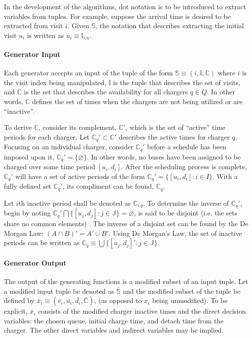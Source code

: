 \documentclass[11pt,a4paper,final]{article}
\newcommand{\I}{\mathbb{I}}                 %
\newcommand{\C}{\mathbb{C}}                 %
\newcommand{\Sol}{\mathbb{S}}               %
\newcommand{\Qset}{Q}                       %
\newcommand{\Jsetq}{\mathbb{J}}             %
\begin{document}
In the development of the algorithms, dot notation is to be introduced to extract variables from tuples. For example,
suppose the arrival time is desired to be extracted from visit \(i\). Given \(\Sol\), the notation that describes extracting
the initial visit \(u_i\) is written as \(u_i \equiv \I_{i.u}\).

\paragraph{Generator Input}
\label{sec:org8a387a7}
Each generator accepts an input of the tuple of the form \(\Sol \equiv (i, \I, \C)\) where \(i\) is the visit index being
manipulated, \(\I\) is the tuple that describes the set of visits, and \(\C\) is the set that describes the availability for
all chargers \(q \in \Qset\). In other words, \(\C\) defines the set of times when the chargers are not being utilized or are
``inactive''.

To derive \(\C\), consider its complement, \(\C'\), which is the set of ``active'' time periods for each charger. Let \(\C_q' \subset
\C'\) describes the active times for charger \(q\). Focusing on an individual charger, consider \(\C_q'\) before a schedule
has been imposed upon it, \(\C_q' = \{ \varnothing \}\). In other words, no buses have been assigned to be charged over
some time period \([u_i, d_i]\). After the scheduling process is complete, \(\C_q'\) will have a set of active periods of
the form \(\C_q' = \{[u_i, d_i]: i \in I\}\). With a fully defined set \(\C_q'\), its compliment can be found, \(\C_q\).

Let \(i\text{th}\) inactive period shall be denoted as \(\C_{i.q}\). To determine the inverse of \(\C_q'\), begin by noting
\(\C_q' \bigcap \{[u_j, d_j] : j \in \Jsetq\} = \varnothing\), is said to be disjoint (i.e. the sets share no common elements)
\cite{halmos-1974-naive-set-theor}. The inverse of a disjoint set can be found by the De Morgan Law: \((A \cap B)' = A' \cup
B'\). Using De Morgan's Law, the set of inactive periods can be written as \(\C_q \equiv \bigcup \{[u_j, d_j]': j \in \Jsetq\}\).

\paragraph{Generator Output}
\label{sec:org311ef17}
The output of the generating functions is a modified subset of an input tuple. Let a modified input tuple be denoted as
\(\bar{\Sol}\) and the modified subset of the tuple be defined by \(\bar{x}_i \equiv (\bar{v_i}, \bar{u_i}, \bar{d_i},
\bar{\C})\), (as opposed to \(x_i\) being unmodified). To be explicit, \(\bar{x}_i\) consists of the modified charger
inactive times and the direct decision variables: the chosen queue, initial charge time, and detach time from the
charger. The other direct variables and indirect variables may be implied.
\end{document}
